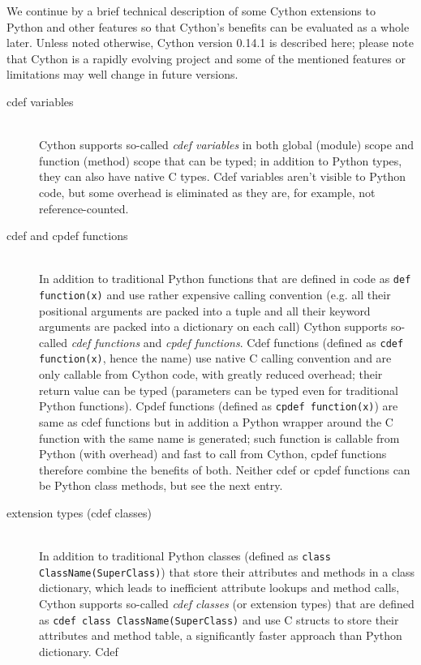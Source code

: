 We continue by a brief technical description of some Cython extensions to Python and other features
so that Cython's benefits can be evaluated as a whole later. Unless noted otherwise, Cython version
0.14.1 is described here; please note that Cython is a rapidly evolving project and some of the
mentioned features or limitations may well change in future versions.
\begin{description}
	\item[cdef variables] \hfill \\
		Cython supports so-called \emph{cdef variables} in both global (module) scope and function
		(method) scope that can be typed; in addition to Python types, they can also have native
		C types. Cdef variables aren't visible to Python code, but some overhead is eliminated as they
		are, for example, not reference-counted.
	\item[cdef and cpdef functions] \hfill \\
		In addition to traditional Python functions that are defined in code as \verb|def function(x)|
		and use rather expensive calling convention (e.g. all their positional arguments are packed
		into a tuple and all their keyword arguments are packed into a dictionary on each call)
		Cython supports so-called \emph{cdef functions} and \emph{cpdef functions}. Cdef functions
		(defined as \verb|cdef function(x)|, hence the name) use native C calling convention and
		are only callable from Cython code, with greatly reduced overhead; their return value can
		be typed (parameters can be typed even for traditional Python functions). Cpdef functions
		(defined as \verb|cpdef function(x)|) are same as cdef functions but in addition a Python
		wrapper around the C function with the same name is generated; such function is callable
		from Python (with overhead) and fast to call from Cython, cpdef functions therefore combine
		the benefits of both.
		Neither cdef or cpdef functions can be Python class methods, but see the next entry.
	\item[extension types (cdef classes)] \hfill \\
		In addition to traditional Python classes (defined as \verb|class ClassName(SuperClass)|) that
		store their attributes and methods in a class dictionary, which leads to inefficient attribute
		lookups and method calls, Cython supports so-called \emph{cdef classes} (or extension types)
		that are defined as \verb|cdef class ClassName(SuperClass)| and use C structs to store their
		attributes and method table, a significantly faster approach than Python dictionary. Cdef

\end{description}
